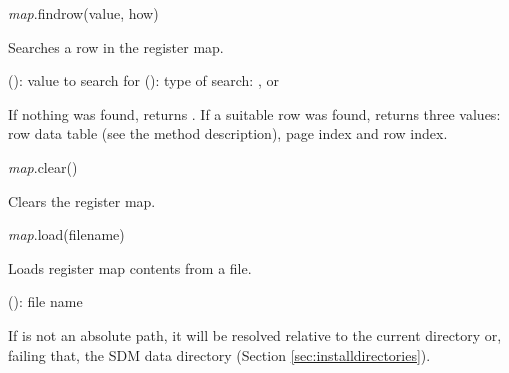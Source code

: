 \documentclass[a4paper,12pt,twoside,extrafontsizes]{memoir}
\begin{document}

\begin{luafuncprototype}
\emph{map}.findrow(value, how)
\end{luafuncprototype}

\begin{funcdescr}
	Searches a row in the register map.
\end{funcdescr}

\begin{funcparams}
	 (): value to search for
	 (): type of search: ,  or 
\end{funcparams}

\begin{funcret}
	If nothing was found, returns . If a suitable row was found, returns three values: row data table (see the  method description), page index and row index.
\end{funcret}


\begin{luafuncprototype}
\emph{map}.clear()
\end{luafuncprototype}

\begin{funcdescr}
	Clears the register map.
\end{funcdescr}


\begin{luafuncprototype}
\emph{map}.load(filename)
\end{luafuncprototype}

\begin{funcdescr}
	Loads register map contents from a file.
\end{funcdescr}

\begin{funcparams}
	 (): file name
\end{funcparams}

\begin{funcremarks}
	If  is not an absolute path, it will be resolved relative to the current directory or, failing that, the SDM data directory (Section \ref{sec:installdirectories}).
\end{funcremarks}
\end{document}
